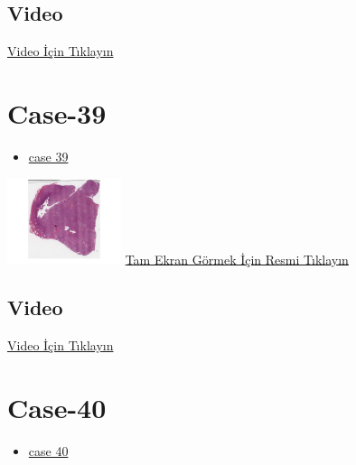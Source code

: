 \documentclass[
  letterpaper,
  DIV=11,
  numbers=noendperiod]{scrreprt}
\providecommand{\tightlist}{%
  \setlength{\itemsep}{0pt}\setlength{\parskip}{0pt}}\usepackage{longtable,booktabs,array}
\begin{document}
\hypertarget{video-36}{%
\subsection{Video}\label{video-36}}

\href{https://www.youtube.com/watch?v=hhO5QsqIPFg}{Video İçin Tıklayın}

\hypertarget{sec-hacettepe-case-of-the-month-case-39}{%
\section{Case-39}\label{sec-hacettepe-case-of-the-month-case-39}}

\begin{itemize}
\tightlist
\item
  \href{https://www.youtube.com/watch?v=q4nuIBROlZI\&ab_channel=KemalKosemehmetoglu}{case
  39}
\end{itemize}

\href{https://images.patolojiatlasi.com/hacettepe-com-case-39/HE.html}{\includegraphics[width=0.25\textwidth,height=\textheight]{./screenshots/hacettepe-com-case-39_screenshot.png}}
\href{https://images.patolojiatlasi.com/hacettepe-com-case-39/HE.html}{Tam
Ekran Görmek İçin Resmi Tıklayın}

\hypertarget{video-37}{%
\subsection{Video}\label{video-37}}

\href{https://www.youtube.com/watch?v=q4nuIBROlZI}{Video İçin Tıklayın}

\hypertarget{sec-hacettepe-case-of-the-month-case-}{%
\section{Case-40}\label{sec-hacettepe-case-of-the-month-case-}}

\begin{itemize}
\tightlist
\item
  \href{https://www.youtube.com/watch?v=In97sPfT9w4\&ab_channel=KemalKosemehmetoglu}{case
  40}
\end{itemize}
\end{document}
